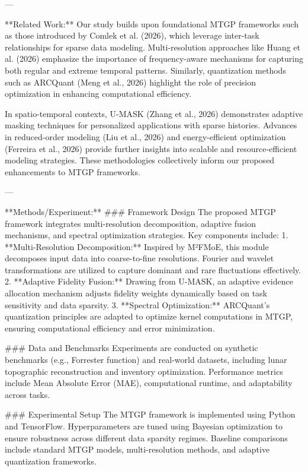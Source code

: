 ---

**Related Work:**  
Our study builds upon foundational MTGP frameworks such as those introduced by Comlek et al. (2026), which leverage inter-task relationships for sparse data modeling. Multi-resolution approaches like Huang et al. (2026) emphasize the importance of frequency-aware mechanisms for capturing both regular and extreme temporal patterns. Similarly, quantization methods such as ARCQuant (Meng et al., 2026) highlight the role of precision optimization in enhancing computational efficiency.  

In spatio-temporal contexts, U-MASK (Zhang et al., 2026) demonstrates adaptive masking techniques for personalized applications with sparse histories. Advances in reduced-order modeling (Liu et al., 2026) and energy-efficient optimization (Ferreira et al., 2026) provide further insights into scalable and resource-efficient modeling strategies. These methodologies collectively inform our proposed enhancements to MTGP frameworks.  

---

**Methods/Experiment:**  
### Framework Design  
The proposed MTGP framework integrates multi-resolution decomposition, adaptive fusion mechanisms, and spectral optimization strategies. Key components include:  
1. **Multi-Resolution Decomposition:** Inspired by M²FMoE, this module decomposes input data into coarse-to-fine resolutions. Fourier and wavelet transformations are utilized to capture dominant and rare fluctuations effectively.  
2. **Adaptive Fidelity Fusion:** Drawing from U-MASK, an adaptive evidence allocation mechanism adjusts fidelity weights dynamically based on task sensitivity and data sparsity.  
3. **Spectral Optimization:** ARCQuant's quantization principles are adapted to optimize kernel computations in MTGP, ensuring computational efficiency and error minimization.  

### Data and Benchmarks  
Experiments are conducted on synthetic benchmarks (e.g., Forrester function) and real-world datasets, including lunar topographic reconstruction and inventory optimization. Performance metrics include Mean Absolute Error (MAE), computational runtime, and adaptability across tasks.  

### Experimental Setup  
The MTGP framework is implemented using Python and TensorFlow. Hyperparameters are tuned using Bayesian optimization to ensure robustness across different data sparsity regimes. Baseline comparisons include standard MTGP models, multi-resolution methods, and adaptive quantization frameworks.  

